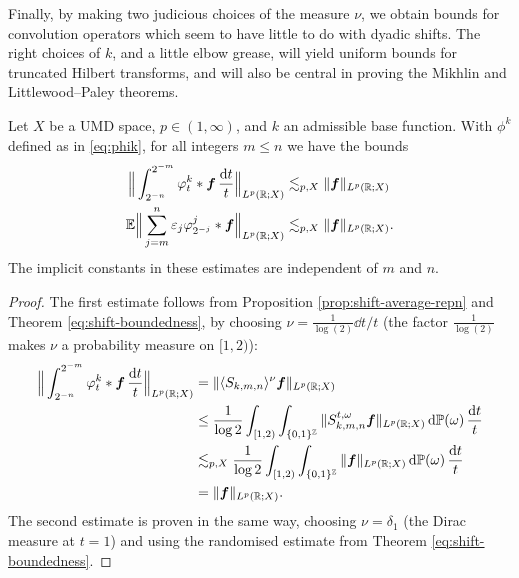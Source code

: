 {Finally, by making two judicious choices of the measure $\nu$, we obtain bounds for convolution operators which seem to have little to do with dyadic shifts.
The right choices of $k$, and a little elbow grease, will yield uniform bounds for truncated Hilbert transforms, and will also be central in proving the Mikhlin and Littlewood--Paley theorems. 

\begin{cor}\label{cor:intop-bounds}
  Let $X$ be a UMD space, $p \in (1,\infty)$, and $k$ an admissible base function.
  With $\phi^{k}$ defined as in \eqref{eq:phik}, for all integers $m \leq n$ we have the bounds
  \begin{equation*}
    \begin{aligned}
      \Big\| \int_{2^{-n}}^{2^{-m}} \varphi_{t}^{k} \ast \bm{f} \, \frac{\mathrm{d} t}{t} \Big\|_{L^p(\mathbb{R};X)} &\lesssim_{p,X} \|\bm{f}\|_{L^p(\mathbb{R};X)} \\
      \mathbb{E} \Big\| \sum_{j = m}^{n} \varepsilon_{j} \varphi_{2^{-j}}^{j} \ast \bm{f} \Big\|_{L^p(\mathbb{R};X)} &\lesssim_{p,X} \|\bm{f}\|_{L^p(\mathbb{R};X)}.
    \end{aligned}
  \end{equation*}
  The implicit constants in these estimates are independent of $m$ and $n$.
\end{cor}

\begin{proof}
  The first estimate follows from Proposition \ref{prop:shift-average-repn} and Theorem \ref{eq:shift-boundedness}, by choosing $\nu = \frac{1}{\log(2)}\dd t/t$ (the factor $\frac{1}{\log(2)}$ makes $\nu$ a probability measure on $[1,2)$):
  \begin{equation*}
    \begin{aligned}
      \Big\| \int_{2^{-n}}^{2^{-m}} \varphi_{t}^{k} \ast \bm{f} \, \frac{\mathrm{d} t}{t} \Big\|_{L^p(\mathbb{R};X)}
      &= \| \langle S_{k,m,n} \rangle^{\nu} \bm{f} \|_{L^p(\mathbb{R};X)} \\
      &\leq \frac{1}{\log 2}\int_{[1,2)} \int_{\{0,1\}^{\mathbb{Z}}} \|S_{k,m,n}^{t,\omega} \bm{f} \|_{L^p(\mathbb{R};X)} \, \mathrm{d}\mathbb{P}(\omega) \, \frac{\mathrm{d} t}{t} \\
      &\lesssim_{p,X} \frac{1}{\log 2} \int_{[1,2)} \int_{\{0,1\}^{\mathbb{Z}}} \| \bm{f} \|_{L^p(\mathbb{R};X)} \, \mathrm{d}\mathbb{P}(\omega) \, \frac{\mathrm{d} t}{t} \\
      &= \|\bm{f}\|_{L^p(\mathbb{R};X)}.
    \end{aligned}
  \end{equation*}
  The second estimate is proven in the same way, choosing $\nu = \delta_{1}$ (the Dirac measure at $t=1$) and using the randomised estimate from Theorem \ref{eq:shift-boundedness}.
\end{proof}

}

